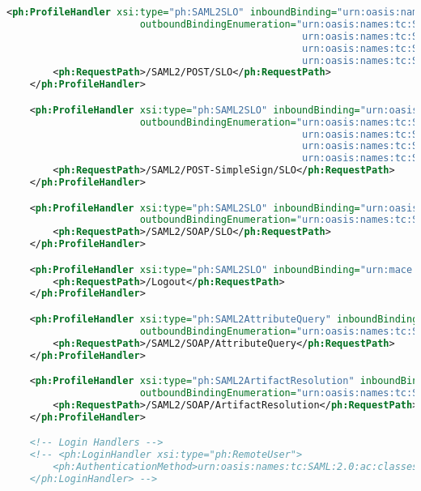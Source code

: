 \begin{lstlisting}[language=xml]
    <ph:ProfileHandler xsi:type="ph:SAML2SLO" inboundBinding="urn:oasis:names:tc:SAML:2.0:bindings:HTTP-POST"
                       outboundBindingEnumeration="urn:oasis:names:tc:SAML:2.0:bindings:HTTP-Redirect
                                                   urn:oasis:names:tc:SAML:2.0:bindings:HTTP-POST-SimpleSign
                                                   urn:oasis:names:tc:SAML:2.0:bindings:HTTP-POST
                                                   urn:oasis:names:tc:SAML:2.0:bindings:HTTP-Artifact">
        <ph:RequestPath>/SAML2/POST/SLO</ph:RequestPath>
    </ph:ProfileHandler>

    <ph:ProfileHandler xsi:type="ph:SAML2SLO" inboundBinding="urn:oasis:names:tc:SAML:2.0:bindings:HTTP-POST-SimpleSign"
                       outboundBindingEnumeration="urn:oasis:names:tc:SAML:2.0:bindings:HTTP-Redirect
                                                   urn:oasis:names:tc:SAML:2.0:bindings:HTTP-POST-SimpleSign
                                                   urn:oasis:names:tc:SAML:2.0:bindings:HTTP-POST
                                                   urn:oasis:names:tc:SAML:2.0:bindings:HTTP-Artifact">
        <ph:RequestPath>/SAML2/POST-SimpleSign/SLO</ph:RequestPath>
    </ph:ProfileHandler>

    <ph:ProfileHandler xsi:type="ph:SAML2SLO" inboundBinding="urn:oasis:names:tc:SAML:2.0:bindings:SOAP"
                       outboundBindingEnumeration="urn:oasis:names:tc:SAML:2.0:bindings:SOAP">
        <ph:RequestPath>/SAML2/SOAP/SLO</ph:RequestPath>
    </ph:ProfileHandler>

    <ph:ProfileHandler xsi:type="ph:SAML2SLO" inboundBinding="urn:mace:shibboleth:2.0:profiles:LocalLogout">
        <ph:RequestPath>/Logout</ph:RequestPath>
    </ph:ProfileHandler>

    <ph:ProfileHandler xsi:type="ph:SAML2AttributeQuery" inboundBinding="urn:oasis:names:tc:SAML:2.0:bindings:SOAP"
                       outboundBindingEnumeration="urn:oasis:names:tc:SAML:2.0:bindings:SOAP">
        <ph:RequestPath>/SAML2/SOAP/AttributeQuery</ph:RequestPath>
    </ph:ProfileHandler>

    <ph:ProfileHandler xsi:type="ph:SAML2ArtifactResolution" inboundBinding="urn:oasis:names:tc:SAML:2.0:bindings:SOAP"
                       outboundBindingEnumeration="urn:oasis:names:tc:SAML:2.0:bindings:SOAP">
        <ph:RequestPath>/SAML2/SOAP/ArtifactResolution</ph:RequestPath>
    </ph:ProfileHandler>

    <!-- Login Handlers -->
    <!-- <ph:LoginHandler xsi:type="ph:RemoteUser">
        <ph:AuthenticationMethod>urn:oasis:names:tc:SAML:2.0:ac:classes:unspecified</ph:AuthenticationMethod>
    </ph:LoginHandler> -->


\end{lstlisting}
